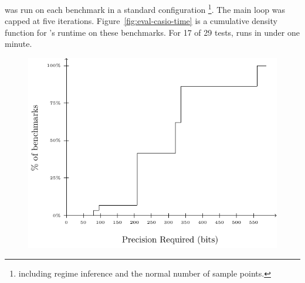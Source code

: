 \documentclass[paper.tex]{subfiles}
\begin{document}
\casio was run on each benchmark in a standard configuration%
\footnote{including regime inference and the normal number of sample
  points.}.  The main loop was capped at five iterations.
Figure~\ref{fig:eval-casio-time} is a cumulative density function for
\casio's runtime on these benchmarks.  For 17 of 29 tests, \casio runs
in under one minute.

\begin{figure}
\label{fig:eval-mpfr-bits}
\includegraphics[width=0.9\columnwidth]{fig/eval-mpfr-bits.pdf}
\caption{}
\end{figure}
\end{document}
